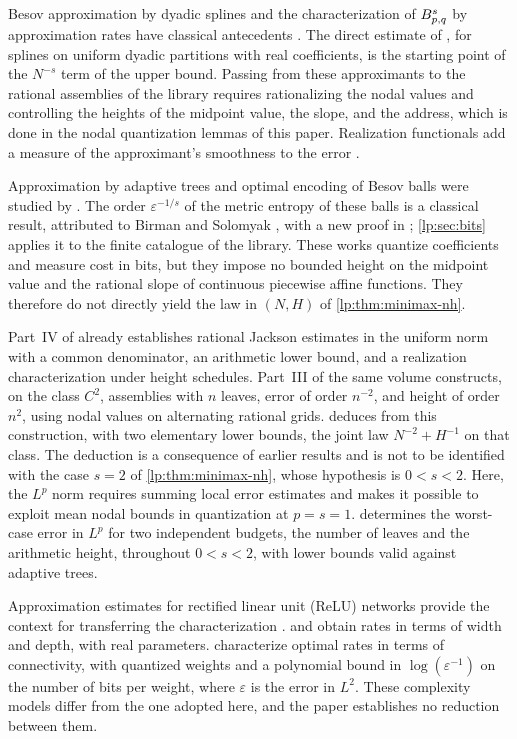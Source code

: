 \documentclass[11pt,a4paper]{article}
\begin{document}
Besov approximation by dyadic splines and the characterization of $B^{s}_{p,q}$ by approximation rates have classical antecedents \citep{artigo_1-devore1998,artigo_2-devorepopov1988,artigo_2-devorepopov1988b,artigo_2-petrushev1988,lp-petrushevpopov1987}. The direct estimate of \citet{artigo_2-devorepopov1988}, for splines on uniform dyadic partitions with real coefficients, is the starting point of the $N^{-s}$ term of the upper bound. Passing from these approximants to the rational assemblies of the library requires rationalizing the nodal values and controlling the heights of the midpoint value, the slope, and the address, which is done in the nodal quantization lemmas of this paper. Realization functionals add a measure of the approximant's smoothness to the error \citep{lp-ditzian2007,artigo_2-hristovivanov1990,lp-kolomoitsev2019}.\par Approximation by adaptive trees and optimal encoding of Besov balls were studied by \citet{lp-cohen2001}. The order $\varepsilon^{-1/s}$ of the metric entropy of these balls is a classical result, attributed to Birman and Solomyak \citep{lp-birmansolomyak1967}, with a new proof in \citet{lp-kerkyacharianpicard2003}; \cref{lp:sec:bits} applies it to the finite catalogue of the library. These works quantize coefficients and measure cost in bits, but they impose no bounded height on the midpoint value and the rational slope of continuous piecewise affine functions. They therefore do not directly yield the law in $(N,H)$ of \cref{lp:thm:minimax-nh}.\par Part~IV of \citet{lp-oliveiravol} already establishes rational Jackson estimates in the uniform norm with a common denominator, an arithmetic lower bound, and a realization characterization under height schedules. Part~III of the same volume constructs, on the class $C^2$, assemblies with $n$ leaves, error of order $n^{-2}$, and height of order $n^2$, using nodal values on alternating rational grids.  deduces from this construction, with two elementary lower bounds, the joint law $N^{-2}+H^{-1}$ on that class. The deduction is a consequence of earlier results and is not to be identified with the case $s=2$ of \cref{lp:thm:minimax-nh}, whose hypothesis is $0<s<2$. Here, the $L^p$ norm requires summing local error estimates and makes it possible to exploit mean nodal bounds in quantization at $p=s=1$.  determines the worst-case error in $L^p$ for two independent budgets, the number of leaves and the arithmetic height, throughout $0<s<2$, with lower bounds valid against adaptive trees.\par Approximation estimates for rectified linear unit (ReLU) networks provide the context for transferring the characterization \citep{lp-ali2020,artigo_1-devore2021}. \citet{lp-siegel2023} and \citet{lp-yang2024} obtain rates in terms of width and depth, with real parameters. \citet{lp-elbrachter2021} characterize optimal rates in terms of connectivity, with quantized weights and a polynomial bound in $\log(\varepsilon^{-1})$ on the number of bits per weight, where $\varepsilon$ is the error in $L^2$. These complexity models differ from the one adopted here, and the paper establishes no reduction between them.
\end{document}
